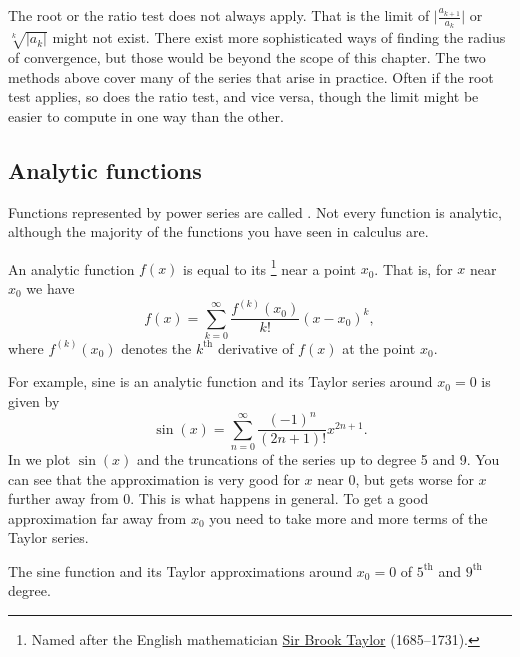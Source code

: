 The root or the ratio test does not always apply.  That is
the limit
of
$\bigl \lvert \frac{a_{k+1}}{a_k} \bigr \rvert$
or
$\sqrt[k]{\lvert a_k \rvert}$
might not exist.
There exist more sophisticated ways of finding the radius of convergence,
but those would be beyond the scope of this chapter.  The two methods above
cover many of the series that arise in practice.  Often if the root test
applies, so does the ratio test, and vice versa, though the limit might
be easier to compute in one way than the other.

\subsection{Analytic functions}

Functions represented by power series are called
\emph{}.  Not every function is analytic,
although the majority of the functions you have seen in calculus are.

An analytic function $f(x)$ is equal to its \emph{}%
\footnote{Named after the English mathematician
\href{http://en.wikipedia.org/wiki/Brook_Taylor}{Sir Brook Taylor}
(1685--1731).}
near a point $x_0$.
That is, for $x$ near $x_0$ we have
\begin{equation} \label{ps:tayloreq}
f(x) = \sum_{k=0}^\infty \frac{f^{(k)}(x_0)}{k!} {(x-x_0)}^k ,
\end{equation}
where $f^{(k)}(x_0)$ denotes the $k^{\text{th}}$ derivative of $f(x)$
at the point $x_0$.

For example, sine is an analytic function and its Taylor series
around $x_0 = 0$
is given by
\begin{equation*}
\sin(x) = \sum_{n=0}^\infty \frac{{(-1)}^n}{(2n+1)!}
 x^{2n+1} .
\end{equation*}
In  we plot $\sin(x)$ and the truncations of the
series up to degree 5 and 9.  You can see that the approximation is very
good for $x$ near 0, but gets worse for $x$ further away from 0.  This is 
what happens in general.
To get a good approximation far away from $x_0$ you
need to take more and more terms of the Taylor series.

\begin{myfig}
\capstart
{}
\caption{The sine function and its Taylor approximations
around $x_0=0$
of $5^{\text{th}}$ and $9^{\text{th}}$ degree.\label{ps:sin}}
\end{myfig}


